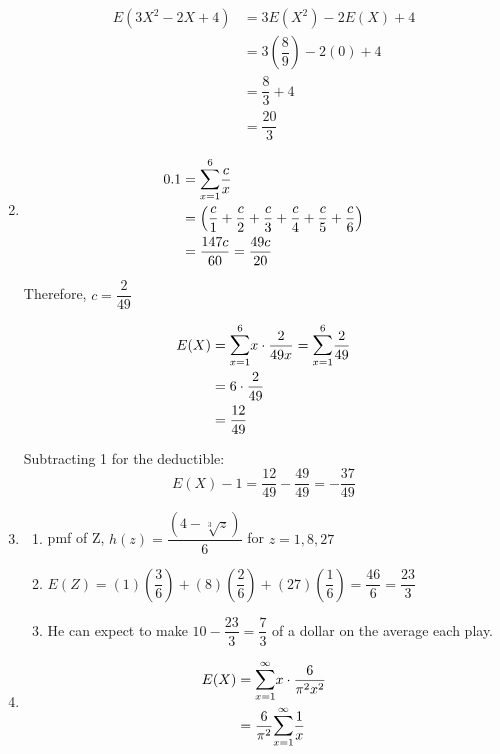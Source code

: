 \documentclass{article}
\begin{document}
\begin{enumerate}
	\begin{align*}
	 E(3X^2 - 2X + 4) &= 3E(X^2) - 2E(X) + 4 \\
			  &= 3\left(\dfrac{8}{9}\right) - 2(0) + 4 \\
			  &= \dfrac{8}{3} + 4 \\
			  &= \dfrac{20}{3}
	\end{align*}
      \addtocounter{enumi}{1}
      
     \item
	\begin{align*}
	 0.1 &= \mathlarger{\sum}_{x=1}^6{\dfrac{c}{x}} \\
	     &= \left( \dfrac{c}{1} + \dfrac{c}{2} + \dfrac{c}{3} + \dfrac{c}{4} + \dfrac{c}{5}
		+ \dfrac{c}{6} \right) \\
	     &= \dfrac{147c}{60} = \dfrac{49c}{20}
	\end{align*}
	
	Therefore, $c = \dfrac{2}{49}$
	
	\begin{align*}
	 E(X) &= \mathlarger{\sum}_{x=1}^6{x\cdot \dfrac{2}{49x}} 
		= \mathlarger{\sum}_{x=1}^6{\dfrac{2}{49}} \\
	      &= 6\cdot \dfrac{2}{49} \\
	      &= \dfrac{12}{49}
	\end{align*}
	
	Subtracting 1 for the deductible: 
	$$E(X) - 1 = \dfrac{12}{49} - \dfrac{49}{49} = -\dfrac{37}{49}$$
	
     \item 
	\begin{enumerate}
	 \item 
	    pmf of Z, $h(z) = \dfrac{(4 - \sqrt[3]{z})}{6}$ for $z=1,8,27$
	    
	 \item
	    $E(Z) = (1)\left(\dfrac{3}{6}\right) + (8)\left(\dfrac{2}{6}\right) 
		    + (27)\left(\dfrac{1}{6}\right) = \dfrac{46}{6} = \dfrac{23}{3}$
	
	 \item
	    He can expect to make $10 - \dfrac{23}{3} = \dfrac{7}{3}$ of a dollar on the average
	    each play.
	\end{enumerate}

     \item
	\begin{align*}
	 E(X) &= \mathlarger{\sum}_{x=1}^\infty{x\cdot \dfrac{6}{\pi^2 x^2}} \\
	      &= \dfrac{6}{\pi^2} \mathlarger{\sum}_{x=1}^\infty{\dfrac{1}{x}}
	\end{align*}


\end{enumerate}
\end{document}
